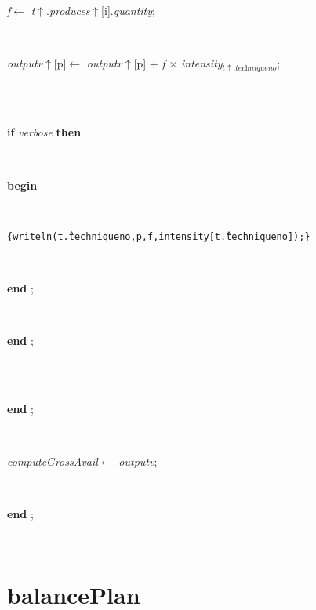 \begin{tabbing}
\parbox{14cm}{\textsf{\textit{f}$\leftarrow$ \textit{t}$\uparrow$.\textit{produces}$\uparrow$\textit{}[i].\textit{quantity}}; }\\
\parbox{14cm}{\textsf{\textit{outputv}$\uparrow$\textit{}[p]$\leftarrow$ \textit{outputv}$\uparrow$\textit{}[p] + \textit{f} $\times$ \textit{intensity}$_{\textit{t}\uparrow.\textit{techniqueno}}$}; }\\
\\
\+\parbox{14cm}{\textsf {\textbf {if } \textsf{\textit{verbose}} \textbf{ then } }}\\
\<\parbox{14cm}{\textsf{\textbf{begin} }}\\
\parbox{14cm}{\texttt{\small{\{writeln(t\^.techniqueno,p,f,intensity[t\^.techniqueno]);\}}}}\\
\<\-\parbox{14cm}{\textsf{\textbf{end} ;}}\\
\<\-\parbox{14cm}{\textsf{\textbf{end} ;}}\\
\\
\<\-\parbox{14cm}{\textsf{\textbf{end} ;}}\\
\parbox{14cm}{\textsf{\textit{computeGrossAvail}$\leftarrow$ \textit{outputv}}; }\\
\<\-\parbox{14cm}{\textsf{\textbf{end} ;}}\\
\end{tabbing}
\section{balancePlan}\label{sec:harmonybalancePlan}


